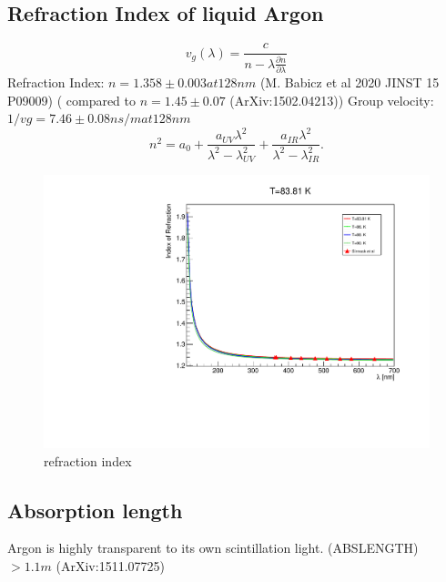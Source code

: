 \documentclass[a4paper]{jpconf}
\begin{document}
\subsection{Refraction Index of liquid Argon}
\begin{equation}
  v_g (\lambda)= \frac{c}{n-\lambda \frac{\partial{n}}{\partial{\lambda}}}
      \label{equ:vgroup}
\end{equation}
Refraction Index: $n = 1.358 \pm 0.003 at 128 nm$ (M. Babicz et al 2020 JINST 15 P09009)
                            ( compared to $n= 1.45 \pm 0.07$ (ArXiv:1502.04213))
Group velocity: $1/ vg = 7.46 \pm 0.08 ns/m at 128 nm$
\begin{equation}
n^2 = a_0 + \frac{a_{UV} \lambda^2}{\lambda^2 -\lambda^2_{UV}}+\frac{a_{IR}\lambda^2}{\lambda^2 - \lambda^2_{IR}}.
 \label{equ:sellmeier}
\end{equation}

\begin{figure}[ht]
\begin{center}
\includegraphics[width=35.5pc]{sellmeier.pdf}
\end{center}
\caption{\label{fig:sellmeier.pdf}refraction index}
\end{figure}

\subsection{Absorption length}
Argon is highly transparent to its own scintillation light. (ABSLENGTH)
  $> 1.1 m$  (ArXiv:1511.07725) 
\end{document}
